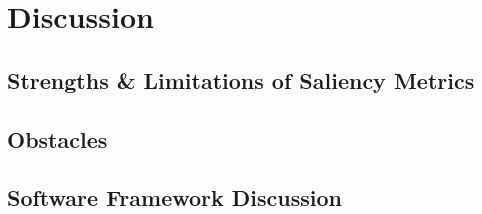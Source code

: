 \documentclass[main]{subfiles}
\begin{document}
\chapter{Discussion}

\section{Strengths \& Limitations of Saliency Metrics}









\section{Obstacles}



\section{Software Framework Discussion}
\end{document}
